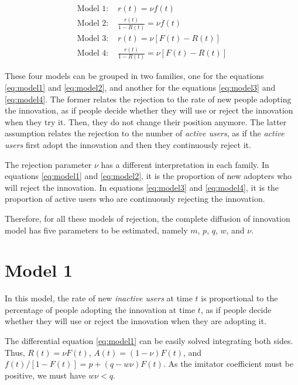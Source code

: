 \begin{align}
	\text{Model 1: }& r(t) = \nu f(t) \label{eq:model1} \\
	\text{Model 2: }& \frac{r(t)}{1-R(t)} = \nu f(t) \label{eq:model2} \\
	\text{Model 3: }& r(t) = \nu [F(t) - R(t)] \label{eq:model3} \\
	\text{Model 4: }& \frac{r(t)}{1-R(t)} = \nu [F(t) - R(t)] \label{eq:model4}
\end{align}


These four models can be grouped in two families, one for the equations \ref{eq:model1} and \ref{eq:model2}, and another for the equations \ref{eq:model3} and \ref{eq:model4}. The former relates the rejection to the rate of new people adopting the innovation, as if people decide whether they will use or reject the innovation when they try it. Then, they do not change their position anymore. The latter assumption relates the rejection to the number of \textit{active users}, as if the \textit{active users} first adopt the innovation and then they continuously reject it.

The rejection parameter $\nu$ has a different interpretation in each family. In equations \ref{eq:model1} and \ref{eq:model2}, it is the proportion of new adopters who will reject the innovation. In equations \ref{eq:model3} and \ref{eq:model4}, it is the proportion of active users who are continuously rejecting the innovation.

Therefore, for all these models of rejection, the complete diffusion of innovation model has five parameters to be estimated, namely $m$, $p$, $q$, $w$, and $\nu$.


\section{Model 1}

In this model, the rate of new \textit{inactive users} at time $t$ is proportional to the percentage of people adopting the innovation at time $t$, as if people decide whether they will use or reject the innovation when they are adopting it.

The differential equation \ref{eq:model1} can be easily solved integrating both sides. Thus, $R(t) = \nu F(t)$, $A(t) = (1 - \nu) F(t)$, and $f(t) / [1 - F(t)] = p + (q - w \nu) F(t)$. As the imitator coefficient must be positive, we must have $w \nu < q$.

